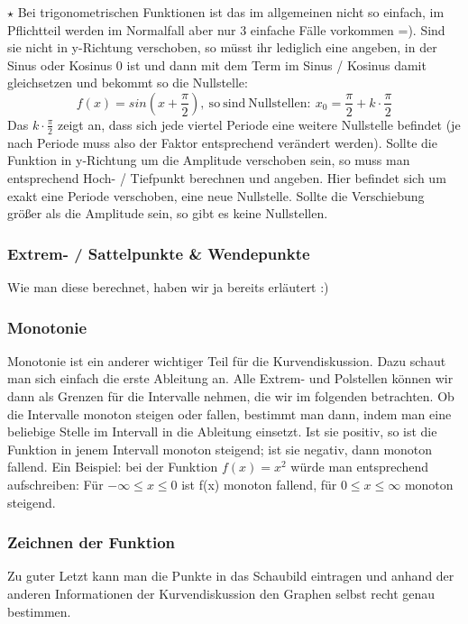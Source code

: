 		\(\star\) Bei trigonometrischen Funktionen ist das im allgemeinen nicht so
		einfach, im Pflichtteil werden im Normalfall aber nur 3 einfache Fälle
		vorkommen =). Sind sie nicht in y-Richtung verschoben, so müsst ihr lediglich
		eine angeben, in der Sinus oder Kosinus 0 ist und dann mit dem Term im Sinus /
		Kosinus damit gleichsetzen und bekommt so die Nullstelle:
		\[f(x)=sin(x+\frac{\pi}{2}),\mathrm{\ so\ sind\ Nullstellen:\
		}x_0=\frac{\pi}{2}+k\cdot \frac{\pi}{2}\]
		Das \(k\cdot \frac{\pi}{2}\) zeigt an, dass sich jede viertel Periode eine
		weitere Nullstelle befindet (je nach Periode muss also der Faktor entsprechend
		verändert werden). Sollte die Funktion in y-Richtung um die Amplitude
		verschoben sein, so muss man entsprechend Hoch- / Tiefpunkt berechnen und
		angeben. Hier befindet sich um exakt eine Periode verschoben, eine neue
		Nullstelle. Sollte die Verschiebung größer als die Amplitude sein, so gibt es
		keine Nullstellen.

	\subsubsection{Extrem- / Sattelpunkte \& Wendepunkte}
		Wie man diese berechnet, haben wir ja bereits erläutert :)

	\subsubsection{Monotonie}
		Monotonie ist ein anderer wichtiger Teil für die Kurvendiskussion. Dazu schaut
		man sich einfach die erste Ableitung an. Alle Extrem- und Polstellen können
		wir dann als Grenzen für die Intervalle nehmen, die wir im folgenden
		betrachten. Ob die Intervalle monoton steigen oder fallen, bestimmt man dann,
		indem man eine beliebige Stelle im Intervall in die Ableitung einsetzt. Ist
		sie positiv, so ist die Funktion in jenem Intervall monoton steigend; ist sie
		negativ, dann monoton fallend. Ein Beispiel: bei der Funktion \(f(x)=x^2\)
		würde man entsprechend aufschreiben: Für \(-\infty \le x \le 0\) ist f(x)
		monoton fallend, für \(0\le x\le \infty\) monoton steigend.

\subsubsection{Zeichnen der Funktion}
	Zu guter Letzt kann man die Punkte in das Schaubild eintragen und anhand der
	anderen Informationen der Kurvendiskussion den Graphen selbst recht genau
	bestimmen.


